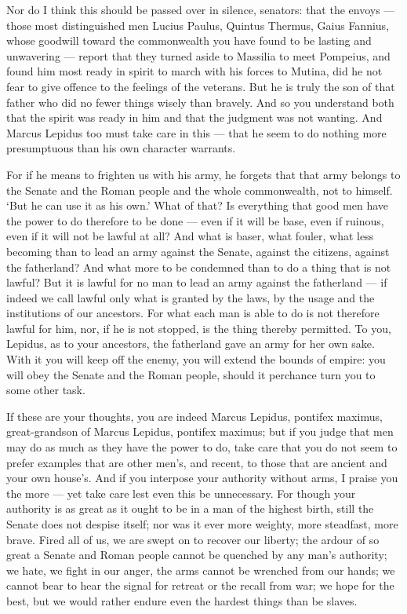  Nor do I think this should be passed over in silence, senators: that the envoys --- those most distinguished men Lucius Paulus, Quintus Thermus, Gaius Fannius, whose goodwill toward the commonwealth you have found to be lasting and unwavering --- report that they turned aside to Massilia to meet Pompeius, and found him most ready in spirit to march with his forces to Mutina, did he not fear to give offence to the feelings of the veterans. But he is truly the son of that father who did no fewer things wisely than bravely. And so you understand both that the spirit was ready in him and that the judgment was not wanting. And Marcus Lepidus too must take care in this --- that he seem to do nothing more presumptuous than his own character warrants.

 For if he means to frighten us with his army, he forgets that that army belongs to the Senate and the Roman people and the whole commonwealth, not to himself. `But he can use it as his own.' What of that? Is everything that good men have the power to do therefore to be done --- even if it will be base, even if ruinous, even if it will not be lawful at all? And what is baser, what fouler, what less becoming than to lead an army against the Senate, against the citizens, against the fatherland? And what more to be condemned than to do a thing that is not lawful? But it is lawful for no man to lead an army against the fatherland --- if indeed we call lawful only what is granted by the laws, by the usage and the institutions of our ancestors. For what each man is able to do is not therefore lawful for him, nor, if he is not stopped, is the thing thereby permitted. To you, Lepidus, as to your ancestors, the fatherland gave an army for her own sake. With it you will keep off the enemy, you will extend the bounds of empire: you will obey the Senate and the Roman people, should it perchance turn you to some other task.

 If these are your thoughts, you are indeed Marcus Lepidus, pontifex maximus, great-grandson of Marcus Lepidus, pontifex maximus; but if you judge that men may do as much as they have the power to do, take care that you do not seem to prefer examples that are other men's, and recent, to those that are ancient and your own house's. And if you interpose your authority without arms, I praise you the more --- yet take care lest even this be unnecessary. For though your authority is as great as it ought to be in a man of the highest birth, still the Senate does not despise itself; nor was it ever more weighty, more steadfast, more brave. Fired all of us, we are swept on to recover our liberty; the ardour of so great a Senate and Roman people cannot be quenched by any man's authority; we hate, we fight in our anger, the arms cannot be wrenched from our hands; we cannot bear to hear the signal for retreat or the recall from war; we hope for the best, but we would rather endure even the hardest things than be slaves.

